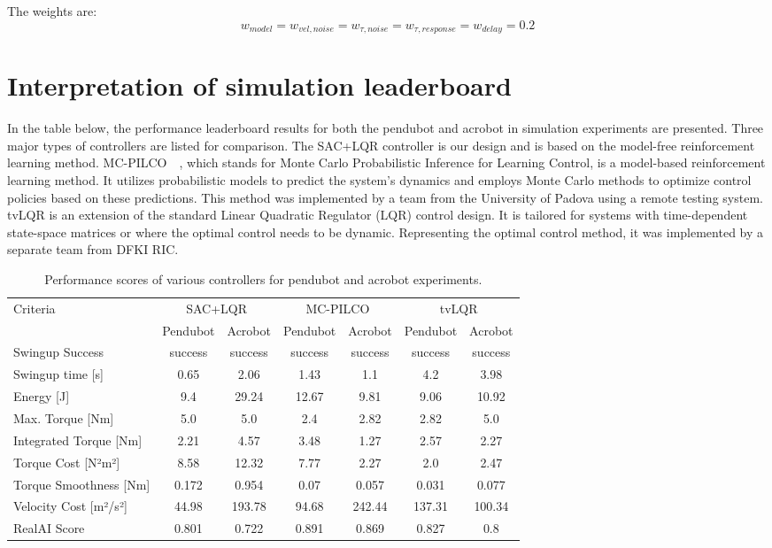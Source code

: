 The weights are:
\begin{equation}
 w_{model} = w_{vel, noise} = w_{\tau, noise} = w_{\tau, response} = w_{delay} = 0.2
\end{equation}

\section{Interpretation of simulation leaderboard}
In the table below, the performance leaderboard results for both the pendubot and acrobot in simulation experiments are presented. Three major types of controllers are listed for comparison. The SAC+LQR controller is our design and is based on the model-free reinforcement learning method. MC-PILCO~\cite{amadio2022model}~\cite{Libera2023AthleticIO}, which stands for Monte Carlo Probabilistic Inference for Learning Control, is a model-based reinforcement learning method. It utilizes probabilistic models to predict the system's dynamics and employs Monte Carlo methods to optimize control policies based on these predictions. This method was implemented by a team from the University of Padova using a remote testing system. tvLQR is an extension of the standard Linear Quadratic Regulator (LQR) control design. It is tailored for systems with time-dependent state-space matrices or where the optimal control needs to be dynamic. Representing the optimal control method, it was implemented by a separate team from DFKI RIC.

\begin{table}[H]
  \centering
 \begin{tabular}{lcccccc}
 \hline
 Criteria & \multicolumn{2}{c}{SAC+LQR} & \multicolumn{2}{c}{MC-PILCO} & \multicolumn{2}{c}{tvLQR} \\
 & Pendubot & Acrobot & Pendubot & Acrobot & Pendubot & Acrobot \\
 \hline
 Swingup Success & success & success & success & success & success & success \\
 Swingup time [s] & 0.65 & 2.06 & 1.43 & 1.1 & 4.2 & 3.98 \\
 Energy [J] & 9.4 & 29.24 & 12.67 & 9.81 & 9.06 & 10.92 \\
 Max. Torque [Nm] & 5.0 & 5.0 & 2.4 & 2.82 & 2.82 & 5.0 \\
 Integrated Torque [Nm] & 2.21 & 4.57 & 3.48 & 1.27 & 2.57 & 2.27 \\
 Torque Cost [N²m²] & 8.58 & 12.32 & 7.77 & 2.27 & 2.0 & 2.47 \\
 Torque Smoothness [Nm] & 0.172 & 0.954 & 0.07 & 0.057 & 0.031 & 0.077 \\
 Velocity Cost [m²/s²] & 44.98 & 193.78 & 94.68 & 242.44 & 137.31 & 100.34 \\
 RealAI Score & 0.801 & 0.722 & 0.891 & 0.869 & 0.827 & 0.8 \\
 \hline
 \end{tabular}
 \caption{Performance scores of various controllers for pendubot and acrobot experiments.}
 \label{tab:performance}
\end{table}


